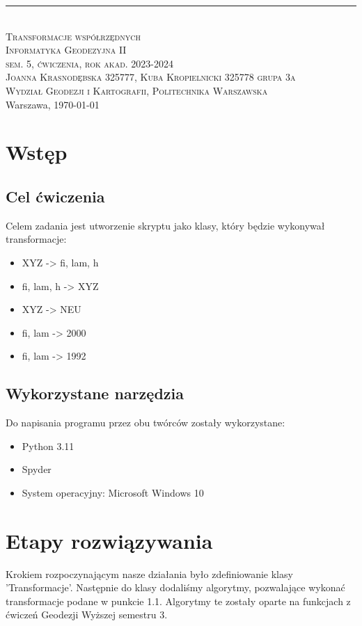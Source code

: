 \documentclass[10pt,a4paper]{article}
\newcommand{\titeReport}{Transformacje współrzędnych} %
\newcommand{\titleLecture}{Informatyka Geodezyjna II \\ sem. 5, ćwiczenia, rok akad. 2023-2024 \\ Joanna Krasnodębska 325777, Kuba Kropielnicki 325778 grupa 3a}
\newcommand{\faculty}{Wydział Geodezji i Kartografii}
\newcommand{\university}{Politechnika Warszawska}
\newcommand{\city}{Warszawa}
\begin{document}
	\begin{center} 
		\rule{\textwidth}{.5pt} \\
		\vspace{1.0cm}
		\Large \textsc{\titeReport}
		\vspace{0.5cm} \\  
		\large \textsc{\titleLecture}
		\vspace{0.5cm}\\
		\textsc{\faculty}, \textsc{\university}  \\ 
		\city, \today
	\end{center}

\tableofcontents
\newpage
\section{Wstęp}
\subsection{Cel ćwiczenia}
Celem zadania jest utworzenie skryptu jako klasy, który będzie wykonywał transformacje:
\begin{itemize}

	\item XYZ -> fi, lam, h
	\item fi, lam, h -> XYZ
	\item XYZ -> NEU
	\item fi, lam -> 2000
	\item fi, lam -> 1992
\end{itemize}
\subsection{Wykorzystane narzędzia}
Do napisania programu przez obu twórców zostały wykorzystane:
\begin{itemize}
	\item Python 3.11
	\item Spyder 
	\item System operacyjny: Microsoft Windows 10
\end{itemize}
\section{Etapy rozwiązywania}
Krokiem rozpoczynającym nasze działania było zdefiniowanie klasy 'Transformacje'. Następnie do klasy dodaliśmy algorytmy, pozwalające wykonać transformacje podane w punkcie 1.1. Algorytmy te zostały oparte na funkcjach z ćwiczeń Geodezji Wyższej  semestru 3.
\vspace{0.5 cm}
\end{document}
